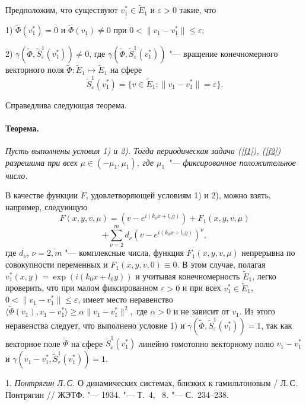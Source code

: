 Предположим, что существуют $v_1^*\in \widetilde{E}_1$ и
$\varepsilon>0$ такие, что

1) $\widetilde{\Phi}(v_1^*)=0$ и $\widetilde{\Phi}(v_1)\neq 0$ при
$0<\|v_1-v_1^*\|\leq\varepsilon$;

2)
$\gamma(\widetilde{\Phi},\widetilde{S}_{\varepsilon}^1(v_1^*))\neq
0$, где
$\gamma(\widetilde{\Phi},\widetilde{S}_{\varepsilon}^1(v_1^*))$ "---
вращение конечномерного векторного поля $\widetilde{\Phi} :
\widetilde{E}_1 \mapsto \widetilde{E}_1$ на сфере
$$
 \widetilde{S}_{\varepsilon}^1(v_1^*)= \{v\in \widetilde{E}_1
: \|v_1-v_1^*\|=\varepsilon\}.
$$

Справедлива следующая теорема.

\paragraph{Теорема.}
{\it
	Пусть выполнены условия 1) и 2). Тогда  периодическая задача
(\ref{f1}), (\ref{f2}) разрешима при всех $\mu\in (-\mu_1 ,
\mu_1)$, где $\mu_1$ "--- фиксированное положительное число.
}

\vspace{0.3 cm}

В качестве функции $F$, удовлетворяющей условиям 1) и 2),
 можно взять, например, следующую
$$
F(x,y,v,\mu)=\left(v-e^{i(k_0x+l_0y)}\right)+ F_1(x,y,v,\mu)
$$
$$
+\sum_{\nu=2}^m
d_{\nu}\left(v-e^{i(k_0x+l_0y)} \right)^{\nu} ,
$$
где $d_{\nu}$, $\nu=\overline{2, m}$ "--- комплексные числа, функция
$F_1(x,y,v,\mu)$ непрерывна по совокупности переменных и
$F_1(x,y,v,0)\equiv 0$. В этом случае, полагая
$v_1^*(x,y)=\exp{(i(k_0x+l_0y))}$ и учитывая конечномерность
$\widetilde{E}_1$, легко проверить, что при малом фиксированном
$\varepsilon>0$ и при всех $v_1^*\in \widetilde{E}_1$,
$0<\|v_1-v_1^*\|\leq\varepsilon$, имеет место неравенство
$
\langle\widetilde{\Phi}(v_1), v_1-v_1^*\rangle  \geq  \alpha
\|v_1-v_1^*\|^2,
$
где $\alpha>0$ и не зависит от $v_1$. Из этого неравенства
следует, что выполнено условие 1) и
$\gamma(\widetilde{\Phi},\widetilde{S}_{\varepsilon}^1(v_1^*))=1$,
так как  векторное поле $\widetilde{\Phi}$ на сфере
$\widetilde{S}_{\varepsilon}^1(v_1^*)$ линейно гомотопно
векторному полю $v_1-v_1^*$ и
$\gamma(v_1-v_1^*,\widetilde{S}_{\varepsilon}^1(v_1^*))=1$.


\vspace{0.3 cm}


\litlist

1. {\it Понтрягин Л.\,С.}
О динамических системах, близких к гамильтоновым  / Л.\,С.
Понтрягин // ЖЭТФ. "--- 1934. "--- Т.~4, \No~8. "--- С.~234--238.

